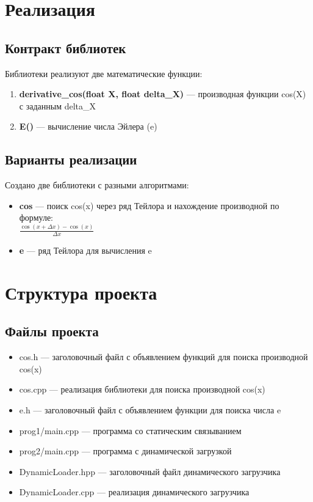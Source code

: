 \section{Реализация}
\subsection{Контракт библиотек}
Библиотеки реализуют две математические функции:
\begin{enumerate}
    \item \textbf{derivative\_cos(float X, float delta\_X)} — производная функции cos(X) с заданным delta\_X
    \item \textbf{E()} — вычисление числа Эйлера (e)
\end{enumerate}

\subsection{Варианты реализации}
Создано две библиотеки с разными алгоритмами:
\begin{itemize}
    \item \textbf{cos} — поиск cos(x) через ряд Тейлора и нахождение производной по формуле:\\
    $\frac{\cos(x + \Delta x) - \cos(x)}{\Delta x}$
    \item \textbf{e} — ряд Тейлора для вычисления e
\end{itemize}

\section{Структура проекта}

\subsection{Файлы проекта}
\begin{itemize}
    \item cos.h — заголовочный файл с объявлением функций для поиска производной cos(x)
    \item cos.cpp — реализация библиотеки для поиска производной cos(x)
    \item e.h — заголовочный файл с объявлением функции для поиска числа e
    \item prog1/main.cpp — программа со статическим связыванием
    \item prog2/main.cpp — программа с динамической загрузкой
    \item DynamicLoader.hpp — заголовочный файл динамического загрузчика
    \item DynamicLoader.cpp — реализация динамического загрузчика
\end{itemize}

